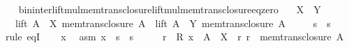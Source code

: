 \begin{isabellebody}
%
\isadelimproof
\ \ %
\endisadelimproof
%
\isatagproof
{}\isamarkupfalse%
%
\endisatagproof
{\isafoldproof}%
%
\isadelimproof
\isanewline
%
\endisadelimproof
\isanewline
{}\isamarkupfalse%
\ bin{\isacharunderscore}{\kern0pt}inter{\isacharunderscore}{\kern0pt}lift{\isacharunderscore}{\kern0pt}mul{\isacharunderscore}{\kern0pt}mem{\isacharunderscore}{\kern0pt}trans{\isacharunderscore}{\kern0pt}closure{\isacharunderscore}{\kern0pt}lift{\isacharunderscore}{\kern0pt}mul{\isacharunderscore}{\kern0pt}mem{\isacharunderscore}{\kern0pt}trans{\isacharunderscore}{\kern0pt}closure{\isacharunderscore}{\kern0pt}eq{\isacharunderscore}{\kern0pt}zero{\isacharcolon}{\kern0pt}\isanewline
\ \ \ {\isachardoublequoteopen}X\ {\isasymnoteq}\ Y{\isachardoublequoteclose}\isanewline
\ \ \ {\isachardoublequoteopen}lift\ {\isacharparenleft}{\kern0pt}A\ {\isacharasterisk}{\kern0pt}\ X{\isacharparenright}{\kern0pt}\ {\isacharparenleft}{\kern0pt}mem{\isacharunderscore}{\kern0pt}trans{\isacharunderscore}{\kern0pt}closure\ A{\isacharparenright}{\kern0pt}\ {\isasyminter}\ lift\ {\isacharparenleft}{\kern0pt}A\ {\isacharasterisk}{\kern0pt}\ Y{\isacharparenright}{\kern0pt}\ {\isacharparenleft}{\kern0pt}mem{\isacharunderscore}{\kern0pt}trans{\isacharunderscore}{\kern0pt}closure\ A{\isacharparenright}{\kern0pt}\ {\isacharequal}{\kern0pt}\ {}{\isachardoublequoteclose}\isanewline
\ \ {\isacharparenleft}{\kern0pt}\ {\isachardoublequoteopen}{\isacharquery}{\kern0pt}s{}\ {\isasyminter}\ {\isacharquery}{\kern0pt}s{}\ {\isacharequal}{\kern0pt}\ {}{\isachardoublequoteclose}{\isacharparenright}{\kern0pt}\isanewline
%
\isadelimproof
%
\endisadelimproof
%
\isatagproof
{}\isamarkupfalse%
\ {\isacharparenleft}{\kern0pt}rule\ eqI{\isacharparenright}{\kern0pt}\isanewline
\ \ \isamarkupfalse%
\ x\ \isamarkupfalse%
\ asm{\isacharcolon}{\kern0pt}\ {\isachardoublequoteopen}x\ {\isasymin}\ {\isacharquery}{\kern0pt}s{}\ {\isasyminter}\ {\isacharquery}{\kern0pt}s{}{\isachardoublequoteclose}\isanewline
\ \ \isamarkupfalse%
\ \isamarkupfalse%
\ r\ \ R{\isacharcolon}{\kern0pt}\ {\isachardoublequoteopen}x\ {\isacharequal}{\kern0pt}\ A\ {\isacharasterisk}{\kern0pt}\ X\ {\isacharplus}{\kern0pt}\ r{\isachardoublequoteclose}\ {\isachardoublequoteopen}r\ {\isasymin}\ mem{\isacharunderscore}{\kern0pt}trans{\isacharunderscore}{\kern0pt}closure\ A{\isachardoublequoteclose}\isanewline

\end{isabellebody}
